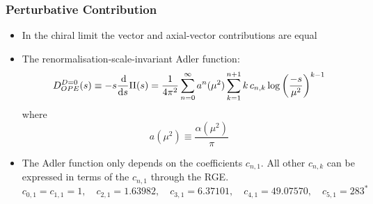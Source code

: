 \documentclass{beamer}
\begin{document}
\begin{frame}
  \frametitle{Perturbative Contribution}
  \begin{itemize}
  \item In the chiral limit the vector and axial-vector contributions are equal
  \item The renormalisation-scale-invariant Adler function:
    \begin{equation}
      D_{OPE}^{D=0}(s) \equiv -s \frac{\dif}{\dif s} \Pi(s)
      = \frac{1}{4 \pi^2} \sum_{n=0}^\infty a^n(\mu^2) \sum_{k=1}^{n+1} k\, c_{n,k} \log\left( \frac{-s}{\mu^2} \right)^{k-1}
    \end{equation}
    where
    \begin{equation}
      a(\mu^2) \equiv \frac{\alpha(\mu^2)}{\pi}
    \end{equation}
  \item The Adler function only depends on the coefficients \(c_{n,1}\). All
    other \(c_{n,k}\) can be expressed in terms of the \(c_{n,1}\) through the
    RGE.
    \begin{equation}
    c_{0,1} = c_{1,1} = 1, \quad c_{2,1} = 1.63982, \quad c_{3,1} = 6.37101, \quad c_{4,1} = 49.07570, \quad c_{5,1} = 283^*
  \end{equation}
\end{itemize}
\end{frame}
\end{document}
